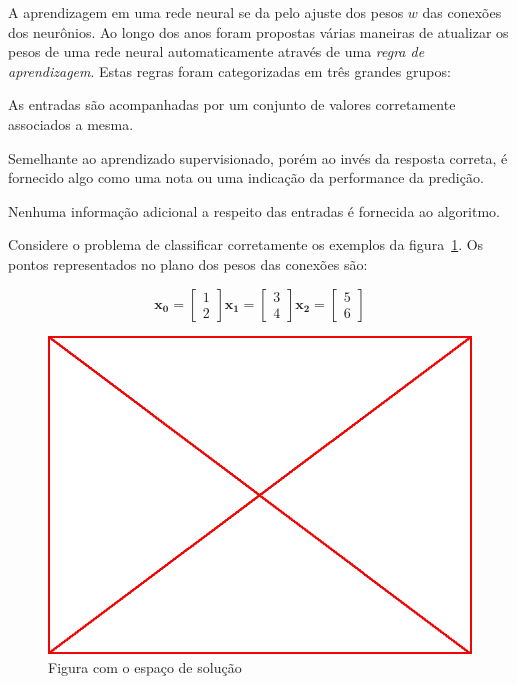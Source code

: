 A aprendizagem em uma rede neural se da pelo ajuste dos pesos $w$ das conexões
dos neurônios. Ao longo dos anos foram propostas várias maneiras de atualizar
os pesos de uma rede neural automaticamente através de uma \emph{regra de
  aprendizagem}. Estas regras foram categorizadas em três grandes grupos:

\begin{description}
  \itemsep1pt\parskip0pt

  \item[Aprendizagem Supervisionada] As entradas são acompanhadas por um
    conjunto de valores corretamente associados a mesma.

  \item[Aprendizagem Por Reforço] Semelhante ao aprendizado supervisionado,
    porém ao invés da resposta correta, é fornecido algo como uma nota ou uma
    indicação da performance da predição.

  \item[Aprendizagem Não Supervisionada] Nenhuma informação adicional a
    respeito das entradas é fornecida ao algoritmo.

\end{description}

Considere o problema de classificar corretamente os exemplos da
figura~\ref{fig:perceptron-problem-layout}. Os pontos representados no plano dos
pesos das conexões são:

$$ \mathbf{x_0} =
\begin{bmatrix}
  1\\
  2
\end{bmatrix}
\mathbf{x_1} = \begin{bmatrix}
  3\\
  4
\end{bmatrix}
\mathbf{x_2} = \begin{bmatrix}
  5\\
  6
\end{bmatrix}
$$

\begin{figure}\label{fig:perceptron-problem-layout}
  \caption{Figura com o espaço de solução}
  \begin{center}
    \includegraphics[scale=0.5]{placeholder}
  \end{center}
\end{figure}

